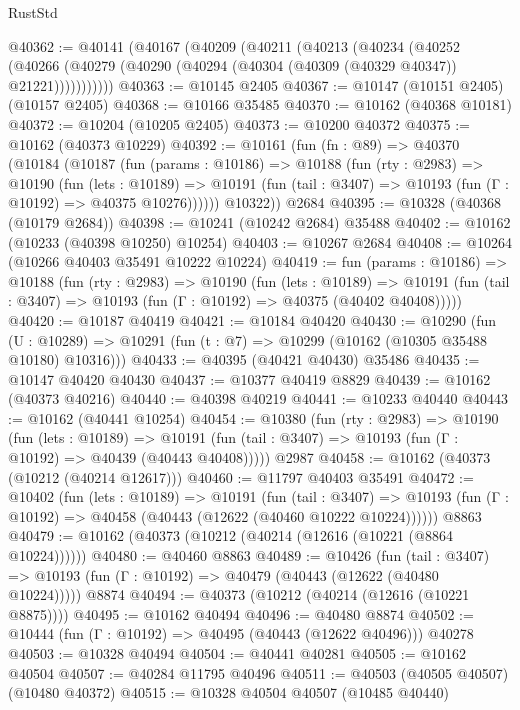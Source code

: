 \begin{lexlean}{RustStd}
\begin{coremodule}
@40362 := @40141
    (@40167
      (@40209
        (@40211
          (@40213
            (@40234
              (@40252
                (@40266 (@40279 (@40290 (@40294 (@40304 (@40309 (@40329 @40347)) @21221)))))))))))
@40363 := @10145 @2405
@40367 := @10147 (@10151 @2405) (@10157 @2405)
@40368 := @10166 @35485
@40370 := @10162 (@40368 @10181)
@40372 := @10204 (@10205 @2405)
@40373 := @10200 @40372
@40375 := @10162 (@40373 @10229)
@40392 := @10161
    (fun (fn : @89) =>
    @40370
      (@10184
        (@10187
          (fun (params : @10186) =>
          @10188
            (fun (rty : @2983) =>
            @10190
              (fun (lets : @10189) =>
              @10191 (fun (tail : @3407) => @10193 (fun (Γ : @10192) => @40375 @10276))))))
        @10322))
    @2684
@40395 := @10328 (@40368 (@10179 @2684))
@40398 := @10241 (@10242 @2684) @35488
@40402 := @10162 (@10233 (@40398 @10250) @10254)
@40403 := @10267 @2684
@40408 := @10264 (@10266 @40403 @35491 @10222 @10224)
@40419 := fun (params : @10186) =>
  @10188
    (fun (rty : @2983) =>
    @10190
      (fun (lets : @10189) =>
      @10191 (fun (tail : @3407) => @10193 (fun (Γ : @10192) => @40375 (@40402 @40408)))))
@40420 := @10187 @40419
@40421 := @10184 @40420
@40430 := @10290
    (fun (U : @10289) => @10291 (fun (t : @7) => @10299 (@10162 (@10305 @35488 @10180) @10316)))
@40433 := @40395 (@40421 @40430) @35486
@40435 := @10147 @40420 @40430
@40437 := @10377 @40419 @8829
@40439 := @10162 (@40373 @40216)
@40440 := @40398 @40219
@40441 := @10233 @40440
@40443 := @10162 (@40441 @10254)
@40454 := @10380
    (fun (rty : @2983) =>
    @10190
      (fun (lets : @10189) =>
      @10191 (fun (tail : @3407) => @10193 (fun (Γ : @10192) => @40439 (@40443 @40408)))))
    @2987
@40458 := @10162 (@40373 (@10212 (@40214 @12617)))
@40460 := @11797 @40403 @35491
@40472 := @10402
    (fun (lets : @10189) =>
    @10191
      (fun (tail : @3407) =>
      @10193 (fun (Γ : @10192) => @40458 (@40443 (@12622 (@40460 @10222 @10224))))))
    @8863
@40479 := @10162 (@40373 (@10212 (@40214 (@12616 (@10221 (@8864 @10224))))))
@40480 := @40460 @8863
@40489 := @10426
    (fun (tail : @3407) => @10193 (fun (Γ : @10192) => @40479 (@40443 (@12622 (@40480 @10224)))))
    @8874
@40494 := @40373 (@10212 (@40214 (@12616 (@10221 @8875))))
@40495 := @10162 @40494
@40496 := @40480 @8874
@40502 := @10444 (fun (Γ : @10192) => @40495 (@40443 (@12622 @40496))) @40278
@40503 := @10328 @40494
@40504 := @40441 @40281
@40505 := @10162 @40504
@40507 := @40284 @11795 @40496
@40511 := @40503 (@40505 @40507) (@10480 @40372)
@40515 := @10328 @40504 @40507 (@10485 @40440)

\end{coremodule}
\end{lexlean}
